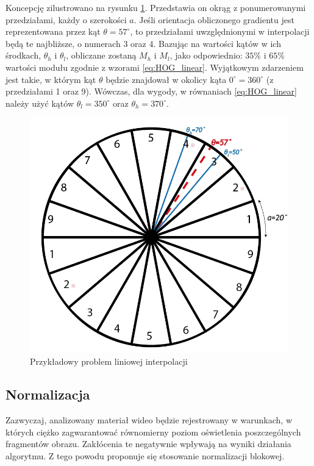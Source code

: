 Koncepcję zilustrowano na rysunku \ref{fig:HOG_interpolation}.  
Przedstawia on okrąg z ponumerowanymi przedziałami, każdy o szerokości $a$. 
Jeśli orientacja obliczonego gradientu jest reprezentowana przez kąt $\theta=57^{\circ}$, to przedziałami uwzględnionymi w interpolacji będą te najbliższe, o numerach $3$ oraz $4$. 
Bazując na wartości kątów w ich środkach, $\theta_h$ i $\theta_l$, obliczane zostaną $M_h$ i $M_l$, jako odpowiednio: $35\%$ i $65\%$ wartości modułu zgodnie z wzorami \eqref{eq:HOG_linear}.
Wyjątkowym zdarzeniem jest takie, w którym kąt $\theta$ będzie znajdował w okolicy kąta $0^{\circ}=360^{\circ}$ (z przedziałami 1 oraz 9). 
Wówczas, dla wygody, w równaniach \eqref{eq:HOG_linear} należy użyć kątów $\theta_l=350^{\circ}$ oraz $\theta_h=370^{\circ}$.

\begin{figure}[h]
	\centering
	\hspace*{1cm}
	\includegraphics[width=12cm]{2_HOG_interpolation.jpg}
	\caption{Przykładowy problem liniowej interpolacji}
	\label{fig:HOG_interpolation}
\end{figure}

\subsection{Normalizacja}

Zazwyczaj, analizowany materiał wideo będzie rejestrowany w warunkach, w których ciężko zagwarantować równomierny poziom oświetlenia poszczególnych fragmentów obrazu.
Zakłócenia te negatywnie wpływają na wyniki działania algorytmu.
Z tego powodu proponuje się stosowanie normalizacji blokowej. 

